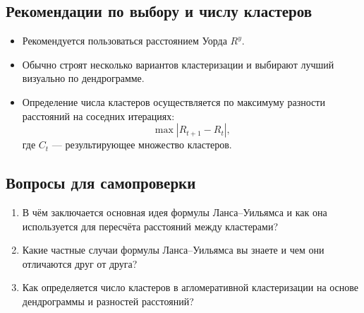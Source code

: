 \subsection{Рекомендации по выбору и числу кластеров}
\begin{itemize}
    \item Рекомендуется пользоваться расстоянием Уорда $R^{y}$.
    \item Обычно строят несколько вариантов кластеризации и выбирают лучший визуально по дендрограмме.
    \item Определение числа кластеров осуществляется по максимуму разности расстояний на соседних итерациях:
    \[
    \max |R_{t+1} - R_t|,
    \]
    где $C_t$ — результирующее множество кластеров.
\end{itemize}


\subsection*{Вопросы для самопроверки}
\begin{enumerate}
    \item В чём заключается основная идея формулы Ланса–Уильямса и как она используется для пересчёта расстояний между кластерами?
    \item Какие частные случаи формулы Ланса–Уильямса вы знаете и чем они отличаются друг от друга?
    \item Как определяется число кластеров в агломеративной кластеризации на основе дендрограммы и разностей расстояний?
\end{enumerate}

